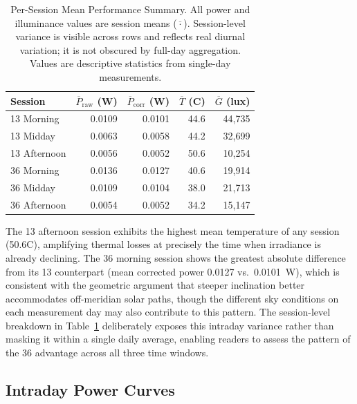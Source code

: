 \documentclass[conference]{IEEEtran}
\begin{document}
\begin{table}[H]
  \caption{Per-Session Mean Performance Summary. All power and illuminance values are
           session means ($\overline{\cdot}$). Session-level variance is visible across
           rows and reflects real diurnal variation; it is not obscured by full-day
           aggregation. Values are descriptive statistics from single-day measurements.}
  \label{tab:sessions}
  \centering
  \renewcommand{\arraystretch}{1.2}
  \begin{tabular}{@{}lrrrr@{}}
    \toprule
    Session & $\overline{P}_{\text{raw}}$ (W) & $\overline{P}_{\text{corr}}$ (W) &
              $\overline{T}$ (\degree{}C) & $\overline{G}$ (lux) \\
    \midrule
    13\degree{} Morning   & 0.0109 & 0.0101 & 44.6 & 44{,}735 \\
    13\degree{} Midday    & 0.0063 & 0.0058 & 44.2 & 32{,}699 \\
    13\degree{} Afternoon & 0.0056 & 0.0052 & 50.6 & 10{,}254 \\
    \midrule
    36\degree{} Morning   & 0.0136 & 0.0127 & 40.6 & 19{,}914 \\
    36\degree{} Midday    & 0.0109 & 0.0104 & 38.0 & 21{,}713 \\
    36\degree{} Afternoon & 0.0054 & 0.0052 & 34.2 & 15{,}147 \\
    \bottomrule
  \end{tabular}
\end{table}

The 13\degree{} afternoon session exhibits the highest mean temperature of any session
(50.6\degree{}C), amplifying thermal losses at precisely the time when irradiance is already
declining. The 36\degree{} morning session shows the greatest absolute difference from its
13\degree{} counterpart (mean corrected power 0.0127 vs.\ 0.0101~W), which is consistent with
the geometric argument that steeper inclination better accommodates off-meridian solar paths,
though the different sky conditions on each measurement day may also contribute to this pattern.
The session-level breakdown in Table~\ref{tab:sessions} deliberately exposes this intraday
variance rather than masking it within a single daily average, enabling readers to assess the
pattern of the 36\degree{} advantage across all three time windows.

\subsection{Intraday Power Curves}
\end{document}
